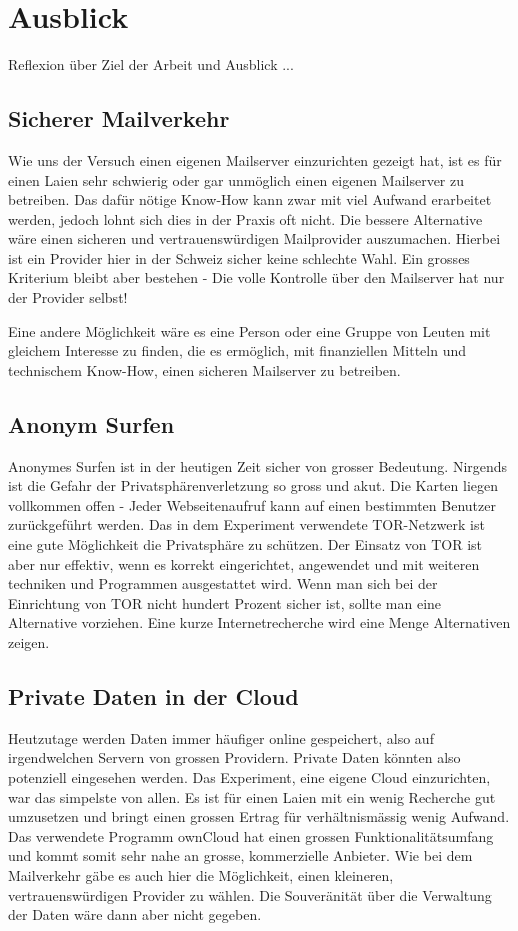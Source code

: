 \section{Ausblick}

Reflexion über Ziel der Arbeit und Ausblick ...

\subsection{Sicherer Mailverkehr}

Wie uns der Versuch einen eigenen Mailserver einzurichten gezeigt hat, 
ist es für einen Laien sehr schwierig oder gar unmöglich einen eigenen Mailserver zu betreiben.
Das dafür nötige Know-How kann zwar mit viel Aufwand erarbeitet werden, jedoch lohnt sich dies in der Praxis oft nicht. 
Die bessere Alternative wäre einen sicheren und vertrauenswürdigen Mailprovider auszumachen. 
Hierbei ist ein Provider hier in der Schweiz sicher keine schlechte Wahl. 
Ein grosses Kriterium bleibt aber bestehen - Die volle Kontrolle über den Mailserver hat nur der Provider selbst!

Eine andere Möglichkeit wäre es eine Person oder eine Gruppe von Leuten mit gleichem Interesse zu finden, die es ermöglich,
mit finanziellen Mitteln und technischem Know-How, einen sicheren Mailserver zu betreiben.

\subsection{Anonym Surfen}

Anonymes Surfen ist in der heutigen Zeit sicher von grosser Bedeutung. 
Nirgends ist die Gefahr der Privatsphärenverletzung so gross und akut. 
Die Karten liegen vollkommen offen - Jeder Webseitenaufruf kann auf einen bestimmten Benutzer zurückgeführt werden.
Das in dem Experiment verwendete TOR-Netzwerk ist eine gute Möglichkeit die Privatsphäre zu schützen.
Der Einsatz von TOR ist aber nur effektiv, wenn es korrekt eingerichtet, angewendet und mit weiteren techniken und Programmen ausgestattet wird.
Wenn man sich bei der Einrichtung von TOR nicht hundert Prozent sicher ist, sollte man eine Alternative vorziehen.
Eine kurze Internetrecherche wird eine Menge Alternativen zeigen.

\subsection{Private Daten in der Cloud}

Heutzutage werden Daten immer häufiger online gespeichert, also auf irgendwelchen Servern von grossen Providern. 
Private Daten könnten also potenziell eingesehen werden. Das Experiment, eine eigene Cloud einzurichten, war das simpelste von allen. 
Es ist für einen Laien mit ein wenig Recherche gut umzusetzen und bringt einen grossen Ertrag für verhältnismässig wenig Aufwand.
Das verwendete Programm ownCloud hat einen grossen Funktionalitätsumfang und kommt somit sehr nahe an grosse, kommerzielle Anbieter.
Wie bei dem Mailverkehr gäbe es auch hier die Möglichkeit, einen kleineren, vertrauenswürdigen Provider zu wählen.
Die Souveränität über die Verwaltung der Daten wäre dann aber nicht gegeben.
